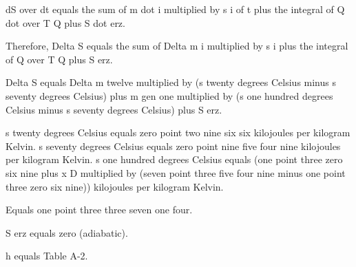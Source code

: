 dS over dt equals the sum of m dot i multiplied by s i of t plus the integral of Q dot over T Q plus S dot erz.  

Therefore, Delta S equals the sum of Delta m i multiplied by s i plus the integral of Q over T Q plus S erz.  

Delta S equals Delta m twelve multiplied by (s twenty degrees Celsius minus s seventy degrees Celsius) plus m gen one multiplied by (s one hundred degrees Celsius minus s seventy degrees Celsius) plus S erz.  

s twenty degrees Celsius equals zero point two nine six six kilojoules per kilogram Kelvin.  
s seventy degrees Celsius equals zero point nine five four nine kilojoules per kilogram Kelvin.  
s one hundred degrees Celsius equals (one point three zero six nine plus x D multiplied by (seven point three five four nine minus one point three zero six nine)) kilojoules per kilogram Kelvin.  

Equals one point three three seven one four.  

S erz equals zero (adiabatic).  

h equals Table A-2.